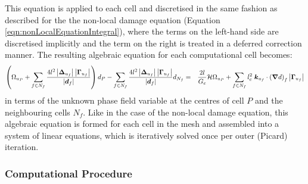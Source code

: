 \documentclass[sn-mathphys,Numbered]{sn-jnl}%
\newcommand{\bb}{\boldsymbol}
\begin{document}
This equation is applied to each cell and discretised in the same fashion as described for the the non-local damage equation (Equation \ref{eqn:nonLocalEquationIntegral}), where the terms on the left-hand side are discretised implicitly and the term on the right is treated in a deferred correction manner.
The resulting algebraic equation for each computational cell becomes:
\begin{eqnarray}
	\left(
		\Omega_{u_P}
		+ \sum_{f \in N_f}
		\frac{4 l^2 \left|\boldsymbol{\Delta}_{u_f} \right| \left| \bb{\Gamma}_{u_f} \right|}{\left|\bb{d}_f\right|}
	\right) d_P
	- \sum_{f \in N_f}
	\frac{4 l^2 \left|\boldsymbol{\Delta}_{u_f}\right| \left|\bb{\Gamma}_{u_f} \right|}{\left|\bb{d}_f\right|} d_{N_f}
	&=&
	\frac{2l}{G_c} \mathcal{H} \Omega_{u_P}
	+ \sum_{f \in N_f} l_c^2 \; \bb{k}_{u_f} \cdot   \left(  \boldsymbol{\nabla} d   \right)_f   \left|\bb{\Gamma}_{u_f}\right| \notag \\
\end{eqnarray}
in terms of the unknown phase field variable at the centres of cell $P$ and the neighbouring cells $N_f$.
Like in the case of the non-local damage equation, this algebraic equation is formed for each cell in the mesh and assembled into a system of linear equations, which is iteratively solved once per outer (Picard) iteration.



\subsubsection{Computational Procedure}
\end{document}
